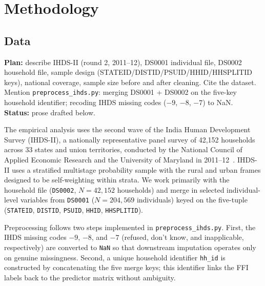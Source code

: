 \documentclass[colorlinks,balance]{asmeconf}
\begin{document}
\section{Methodology}

\subsection{Data}
\begin{outline}
\textbf{Plan:} describe IHDS-II (round 2, 2011--12), DS0001 individual file, DS0002 household file, sample design (STATEID/DISTID/PSUID/HHID/HHSPLITID keys), national coverage, sample size before and after cleaning. Cite the dataset.\\
Mention \texttt{preprocess\_ihds.py}: merging DS0001 + DS0002 on the five-key household identifier; recoding IHDS missing codes ($-9$, $-8$, $-7$) to NaN.\\
\textbf{Status:} prose drafted below.
\end{outline}
The empirical analysis uses the second wave of the India Human Development Survey (IHDS-II), a nationally representative panel survey of 42{,}152 households across 33 states and union territories, conducted by the National Council of Applied Economic Research and the University of Maryland in 2011--12~\cite{ihds2}. IHDS-II uses a stratified multistage probability sample with the rural and urban frames designed to be self-weighting within strata. We work primarily with the household file (\texttt{DS0002}, $N = 42{,}152$ households) and merge in selected individual-level variables from \texttt{DS0001} ($N = 204{,}569$ individuals) keyed on the five-tuple (\texttt{STATEID}, \texttt{DISTID}, \texttt{PSUID}, \texttt{HHID}, \texttt{HHSPLITID}).

Preprocessing follows two steps implemented in \texttt{preprocess\_ihds.py}. First, the IHDS missing codes $-9$, $-8$, and $-7$ (refused, don't know, and inapplicable, respectively) are converted to \texttt{NaN} so that downstream imputation operates only on genuine missingness. Second, a unique household identifier \texttt{hh\_id} is constructed by concatenating the five merge keys; this identifier links the FFI labels back to the predictor matrix without ambiguity.
\end{document}
